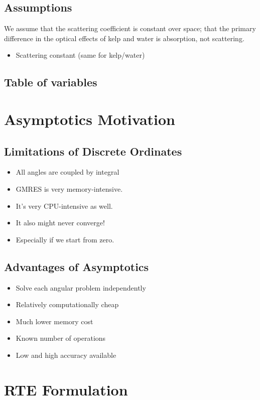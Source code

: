 \documentclass[10pt]{article}
\begin{document}
\subsection{Assumptions}
We assume that the scattering coefficient is constant over space; that the
primary difference in the optical effects of kelp and water is absorption, not
scattering.

\begin{itemize}
  \item Scattering constant (same for kelp/water)
\end{itemize}
  
\subsection{Table of variables}

\section{Asymptotics Motivation}
\subsection{Limitations of Discrete Ordinates}
\begin{itemize}
  \item All angles are coupled by integral
  \item GMRES is very memory-intensive.
  \item It's very CPU-intensive as well.
  \item It also might never converge!
  \item Especially if we start from zero.
\end{itemize}
  
\subsection{Advantages of Asymptotics}
\begin{itemize}
  \item Solve each angular problem independently
  \item Relatively computationally cheap
  \item Much lower memory cost
  \item Known number of operations
  \item Low and high accuracy available
\end{itemize}
  
\section{RTE Formulation}
  
\end{document}
